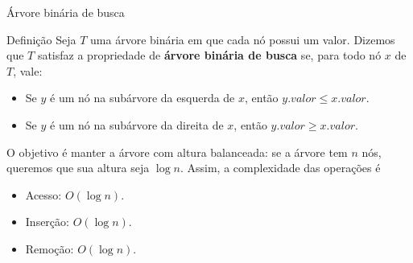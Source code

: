 \begin{frame}{Árvore binária de busca}

    \begin{block}{Definição}
        Seja $T$ uma árvore binária em que cada nó possui um valor. Dizemos que $T$ satisfaz a propriedade de {\bf árvore binária de busca} se, para todo nó $x$ de $T$, vale:
            \begin{itemize}
                \item Se $y$ é um nó na subárvore da esquerda de $x$, então $y.valor \leq x.valor$.
                \item Se $y$ é um nó na subárvore da direita de $x$, então $y.valor \geq x.valor$.
            \end{itemize}
    \end{block}

    O objetivo é manter a árvore com altura balanceada: se a árvore tem $n$ nós, queremos que sua altura seja $\log n$. Assim, a complexidade das operações é

    \begin{itemize}
        \item Acesso: $O(\log n)$.
        \item Inserção: $O(\log n)$.
        \item Remoção: $O(\log n)$.
    \end{itemize}


\end{frame}

